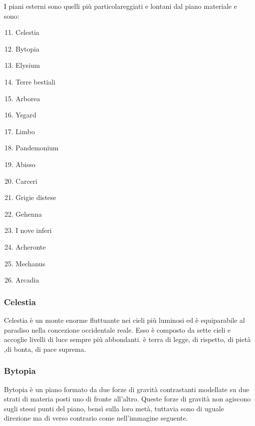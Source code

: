 \documentclass[a4paper,12pt]{book}
\begin{document}
I piani esterni sono quelli più particolareggiati e lontani dal piano materiale e sono:

\begin{enumerate}
\setcounter{enumi}{10}

\item{Celestia}
\item{Bytopia}
\item{Elysium}
\item{Terre bestiali}
\item{Arborea}
\item{Ysgard}
\item{Limbo}
\item{Pandemonium}
\item{Abisso}
\item{Carceri}
\item{Grigie distese}
\item{Gehenna}
\item{I nove inferi}
\item{Acheronte}
\item{Mechanus}
\item{Arcadia}

\end{enumerate}

\subsubsection{Celestia}

Celestia è un monte enorme fluttuante nei cieli più luminosi ed è equiparabile al paradiso nella concezione occidentale reale.
Esso è composto da sette cieli e accoglie livelli di luce sempre più abbondanti.
è terra di legge, di rispetto, di pietà ,di bonta, di pace suprema.

\subsubsection{Bytopia}

Bytopia è un piano formato da due forze di gravità contrastanti modellate su due strati di materia posti uno di fronte all'altro.
Queste forze di gravità non agiscono sugli stessi punti del piano, bensì sulla loro metà, tuttavia sono di uguale direzione ma di verso contrario come nell'immagine seguente.
\end{document}
